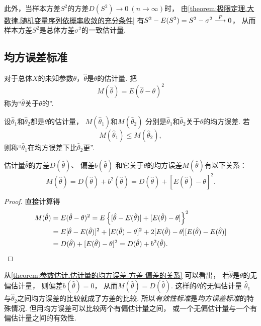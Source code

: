 此外，当样本方差\(S^2\)的方差\(D(S^2) \to 0\ (n\to\infty)\)时，
由\cref{theorem:极限定理.大数律.随机变量序列依概率收敛的充分条件}
有\(S^2 - E(S^2) = S^2 - \sigma^2 \toP 0\)，
从而样本方差\(S^2\)是总体方差\(\sigma^2\)的一致估计量.

\subsection{均方误差标准}
\begin{definition}
对于总体\(X\)的未知参数\(\theta\)，\(\hat{\theta}\)是\(\theta\)的估计量.
把\[
	M(\hat{\theta}) = E(\hat{\theta} - \theta)^2
\]称为“\(\hat{\theta}\)关于\(\theta\)的”.
\end{definition}

\begin{definition}
设\(\hat{\theta}_1\)和\(\hat{\theta}_2\)都是\(\theta\)的估计量，
\(M(\hat{\theta}_1)\)和\(M(\hat{\theta}_2)\)
分别是\(\hat{\theta}_1\)和\(\hat{\theta}_2\)关于\(\theta\)的均方误差.
若\[
	M(\hat{\theta}_1) \leq M(\hat{\theta}_2),
\]
则称“\(\hat{\theta}_1\)在均方误差下比\(\hat{\theta}_2\)更”.
\end{definition}

\begin{theorem}\label{theorem:参数估计.估计量的均方误差-方差-偏差的关系}
估计量\(\hat{\theta}\)的方差\(D(\hat{\theta})\)、
偏差\(b(\hat{\theta})\)
和它关于\(\theta\)的均方误差\(M(\hat{\theta})\)有以下关系：
\begin{equation}
	M(\hat{\theta}) = D(\hat{\theta}) + b^2(\hat{\theta})
	= D(\hat{\theta}) + [E(\hat{\theta}) - \theta]^2.
\end{equation}
\begin{proof}
直接计算得\begin{align*}
	M(\hat{\theta})
	&= E(\hat{\theta} - \theta)^2
	= E\left\{
		[\hat{\theta} - E(\hat{\theta})]
		+ [E(\hat{\theta}) - \theta]
	\right\}^2 \\
	&= E[\hat{\theta} - E(\hat{\theta})]^2
	+ [E(\hat{\theta}) - \theta]^2
	+ 2[E(\hat{\theta}) - \theta][E(\hat{\theta}) - E(\hat{\theta})] \\
	&= D(\hat{\theta}) + [E(\hat{\theta}) - \theta]^2
	= D(\hat{\theta}) + b^2(\hat{\theta}).
	\qedhere
\end{align*}
\end{proof}
\end{theorem}
从\cref{theorem:参数估计.估计量的均方误差-方差-偏差的关系} 可以看出，
若\(\hat{\theta}\)是\(\theta\)的无偏估计量，
则偏差\(b(\hat{\theta})=0\)，
从而\(M(\hat{\theta})=D(\hat{\theta})\).
这样的\(\theta\)的无偏估计量
\(\hat{\theta}_1\)与\(\hat{\theta}_2\)之间均方误差的比较就成了方差的比较.
所以\emph{有效性标准}是\emph{均方误差标准}的特殊情况.
但用均方误差可以比较两个有偏估计量之间，
或一个无偏估计量与一个有偏估计量之间的有效性.

